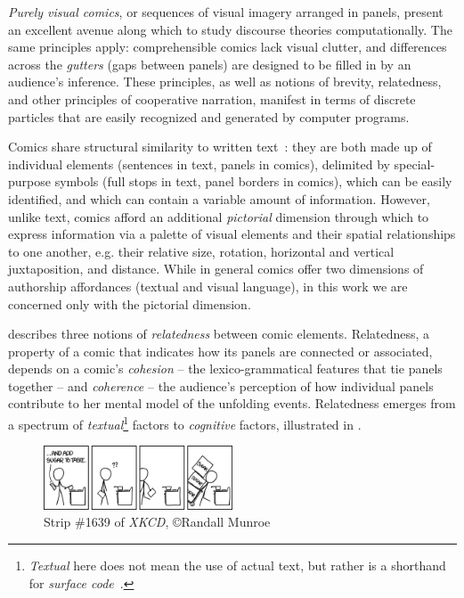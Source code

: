 
{\em Purely visual comics}, or sequences of visual imagery arranged in
panels, present an excellent avenue along which to study discourse
theories computationally. 
The same principles apply: comprehensible comics
lack visual clutter, and differences across the {\em gutters} (gaps between
panels) are designed to be filled in by an audience's inference.
These principles, as well as notions of brevity, relatedness, and other
principles of cooperative narration, manifest in terms of discrete
particles that are easily recognized and generated by computer programs. 

Comics share structural similarity to written
text~\cite{saraceni2016relatedness}: they are both made up of individual
elements (sentences in text, panels in comics), delimited by special-purpose
symbols (full stops in text, panel borders in comics), which can be easily
identified, and which can contain a variable amount of information. However,
unlike text, comics afford an additional \emph{pictorial} dimension through
which to express information via a palette of visual elements and their spatial
relationships to one another, e.g. their relative size, rotation, horizontal and
vertical juxtaposition, and distance. While in general comics offer two
dimensions of authorship affordances (textual and visual language), in this work
we are concerned only with the pictorial dimension.

\citeauthor{saraceni2016relatedness} describes three notions of
\emph{relatedness} between comic elements.
Relatedness, a property of a comic that indicates how its panels are
connected or associated, depends on a comic's \emph{cohesion} -- the
lexico-grammatical features that tie panels together -- and \emph{coherence} --
the audience's perception of how individual panels contribute to her mental model
of the unfolding events. Relatedness emerges from a spectrum of \emph{textual}\footnote{\emph{Textual} here does not mean the use of actual text, but rather is a shorthand for \emph{surface code}~\cite{zwaan1998situation}.}
factors to \emph{cognitive} factors, illustrated in .
%
%

\begin{figure}
\includegraphics[width=0.5\textwidth]{xkcd-to_taste.png}
\caption{Strip \#1639 of {\em XKCD},
  \copyright Randall Munroe}
\label{fig:xkcd}
\end{figure}


